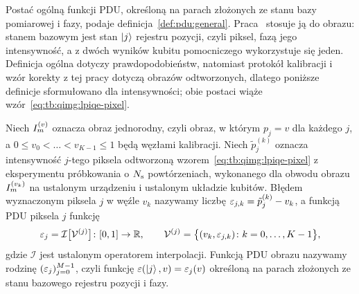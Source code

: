 Postać ogólną funkcji PDU, określoną na parach złożonych ze stanu bazy pomiarowej i fazy, podaje definicja~\ref{def:pdu:general}.
Praca~\cite{werner_error_reduction_2025} stosuje ją do obrazu: stanem bazowym jest stan $\ket{j}$ rejestru pozycji, czyli piksel, fazą jego intensywność, a z dwóch wyników kubitu pomocniczego wykorzystuje się jeden.
Definicja ogólna dotyczy prawdopodobieństw, natomiast protokół kalibracji i wzór korekty z tej pracy dotyczą obrazów odtworzonych, dlatego poniższe definicje sformułowano dla intensywności; obie postaci wiąże wzór~\eqref{eq:tb:qimg:lpiqe-pixel}.

\begin{Definition}\label{def:pdui:function}
Niech $I_m^{(v)}$ oznacza obraz jednorodny, czyli obraz, w którym $p_j=v$ dla każdego $j$, a $0\leq v_0<\dots<v_{K-1}\leq 1$ będą węzłami kalibracji.
Niech $\tilde{p}^{(k)}_j$ oznacza intensywność $j$-tego piksela odtworzoną wzorem~\eqref{eq:tb:qimg:lpiqe-pixel} z eksperymentu próbkowania o $N_{\mathrm{s}}$ powtórzeniach, wykonanego dla obwodu obrazu $I_m^{(v_k)}$ na ustalonym urządzeniu i ustalonym układzie kubitów.
Błędem wyznaczonym piksela $j$ w węźle $v_k$ nazywamy liczbę $\varepsilon_{j,k}=\tilde{p}^{(k)}_j-v_k$, a funkcją PDU piksela $j$ funkcję
\begin{equation}\label{eq:pdui:function}
\varepsilon_j=\mathcal{I}\bigl[\mathcal{V}^{(j)}\bigr]\colon[0,1]\to\mathbb{R},
\qquad
\mathcal{V}^{(j)}=\bigl\{(v_k,\varepsilon_{j,k})\colon k=0,\dots,K-1\bigr\},
\end{equation}
gdzie $\mathcal{I}$ jest ustalonym operatorem interpolacji.
Funkcją PDU obrazu nazywamy rodzinę $(\varepsilon_j)_{j=0}^{M-1}$, czyli funkcję $\varepsilon(\ket{j},v)=\varepsilon_j(v)$ określoną na parach złożonych ze stanu bazowego rejestru pozycji i fazy.
\end{Definition}


